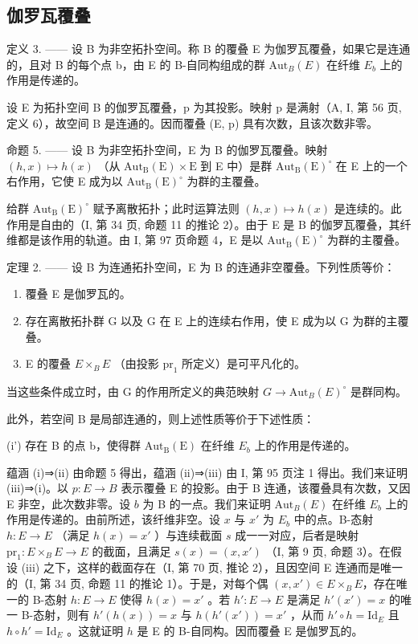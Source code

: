 \subsection{伽罗瓦覆叠}

定义 3. —— 设 B 为非空拓扑空间。称 B 的覆叠 E 为伽罗瓦覆叠，如果它是连通的，且对 B 的每个点 b，由 E 的 B-自同构组成的群 \(\mathrm{Aut}_{B}(E)\) 在纤维 \(E_{b}\) 上的作用是传递的。

设 E 为拓扑空间 B 的伽罗瓦覆叠，p 为其投影。映射 p 是满射（A, I, 第 56 页, 定义 6），故空间 B 是连通的。因而覆叠 (E, p) 具有次数，且该次数非零。

命题 5. —— 设 B 为非空拓扑空间，E 为 B 的伽罗瓦覆叠。映射 \((h,x)\mapsto h(x)\) （从 \(\mathrm{Aut}_{\mathrm{B}}(\mathrm{E})\times\mathrm{E}\) 到 E 中）是群 \(\mathrm{Aut}_{\mathrm{B}}(\mathrm{E})^{\circ}\) 在 E 上的一个右作用，它使 E 成为以 \(\mathrm{Aut}_{\mathrm{B}}(\mathrm{E})^{\circ}\) 为群的主覆叠。

给群 \(\mathrm{Aut}_{\mathrm{B}}(\mathrm{E})^{\circ}\) 赋予离散拓扑；此时运算法则 \((h,x)\mapsto h(x)\) 是连续的。此作用是自由的（I, 第 34 页, 命题 11 的推论 2）。由于 E 是 B 的伽罗瓦覆叠，其纤维都是该作用的轨道。由 I, 第 97 页命题 4，E 是以 \(\mathrm{Aut}_{\mathrm{B}}(\mathrm{E})^{\circ}\) 为群的主覆叠。

定理 2. —— 设 B 为连通拓扑空间，E 为 B 的连通非空覆叠。下列性质等价：

\begin{enumerate}
\def\labelenumi{(\roman{enumi})}
\item
  覆叠 E 是伽罗瓦的。
\item
  存在离散拓扑群 G 以及 G 在 E 上的连续右作用，使 E 成为以 G 为群的主覆叠。
\item
  E 的覆叠 \(E \times_{B} E\) （由投影 \(\mathrm{pr}_{1}\) 所定义）是可平凡化的。
\end{enumerate}

当这些条件成立时，由 G 的作用所定义的典范映射 \(G \to \mathrm{Aut}_{B}(E)^{\circ}\) 是群同构。

此外，若空间 B 是局部连通的，则上述性质等价于下述性质：

(i') 存在 B 的点 b，使得群 \(\mathrm{Aut}_{\mathrm{B}}(\mathrm{E})\) 在纤维 \(E_{b}\) 上的作用是传递的。

蕴涵 (i)⇒(ii) 由命题 5 得出，蕴涵 (ii)⇒(iii) 由 I, 第 95 页注 1 得出。我们来证明 (iii)⇒(i)。以 \(p\colon E \to B\) 表示覆叠 E 的投影。由于 B 连通，该覆叠具有次数，又因 E 非空，此次数非零。设 \(b\) 为 B 的一点。我们来证明 \(\mathrm{Aut}_{B}(E)\) 在纤维 \(E_{b}\) 上的作用是传递的。由前所述，该纤维非空。设 \(x\) 与 \(x'\) 为 \(E_{b}\) 中的点。B-态射 \(h\colon E \to E\) （满足 \(h(x) = x'\) ）与连续截面 \(s\) 成一一对应，后者是映射 \(\mathrm{pr}_{1}\colon E \times_{B} E \to E\) 的截面，且满足 \(s(x) = (x, x')\) （I, 第 9 页, 命题 3）。在假设 (iii) 之下，这样的截面存在（I, 第 70 页, 推论 2），且因空间 E 连通而是唯一的（I, 第 34 页, 命题 11 的推论 1）。于是，对每个偶 \((x, x') \in E \times_{B} E\)，存在唯一的 B-态射 \(h\colon E \to E\) 使得 \(h(x) = x'\) 。若 \(h'\colon E \to E\) 是满足 \(h'(x') = x\) 的唯一 B-态射，则有 \(h'(h(x)) = x\) 与 \(h(h'(x')) = x'\) ，从而 \(h' \circ h = \text{Id}_E\) 且 \(h \circ h' = \text{Id}_E\) 。这就证明 \(h\) 是 E 的 B-自同构。因而覆叠 E 是伽罗瓦的。

